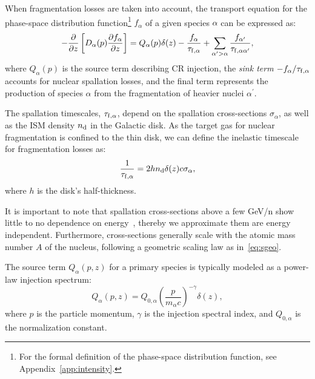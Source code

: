 When fragmentation losses are taken into account, the transport equation for the phase-space distribution function\footnote{For the formal definition of the phase-space distribution function, see Appendix~\ref{app:intensity}.} \(f_\alpha\) of a given species \(\alpha\) can be expressed as:  
\begin{equation}
-\frac{\partial}{\partial z} \left[ D_\alpha(p) \frac{\partial f_\alpha}{\partial z} \right] = 
Q_\alpha(p) \delta(z) - \frac{f_\alpha}{\tau_{\rm f, \alpha}} + \sum_{\alpha^\prime > \alpha}  \frac{f_{\alpha^\prime}}{\tau_{\rm f, \alpha\alpha^\prime}},
\end{equation}
where \(Q_\alpha(p)\) is the source term describing CR injection, the \emph{sink term} \(-f_\alpha / \tau_{\rm f, \alpha}\) accounts for nuclear spallation losses, and the final term represents the production of species \(\alpha\) from the fragmentation of heavier nuclei \(\alpha^\prime\).  

The spallation timescales, \(\tau_{\rm f, \alpha}\), depend on the spallation cross-sections \(\sigma_\alpha\), as well as the ISM density \(n_{\rm d}\) in the Galactic disk. 
%
As the target gas for nuclear fragmentation is confined to the thin disk, we can define the inelastic timescale for fragmentation losses as:  
\begin{equation}
\frac{1}{\tau_{\rm f, \alpha}} = 2 h n_{\rm d} \delta (z) c \sigma_\alpha,
\end{equation}
where \(h\) is the disk's half-thickness.

It is important to note that spallation cross-sections above a few GeV/n show little to no dependence on energy~\cite{Evoli2019prd}, thereby we approximate them are energy independent. Furthermore, cross-sections generally scale with the atomic mass number \(A\) of the nucleus, following a geometric scaling law as in~\cref{eq:sgeo}. 


The source term \(Q_\alpha(p, z)\) for a primary species is typically modeled as a power-law injection spectrum:  
\begin{equation}
Q_\alpha(p, z) = Q_{0,\alpha} \left(\frac{p}{m_\alpha c}\right)^{-\gamma} \delta (z),
\end{equation}
where \(p\) is the particle momentum, \(\gamma\) is the injection spectral index, and \(Q_{0,\alpha}\) is the normalization constant.  

